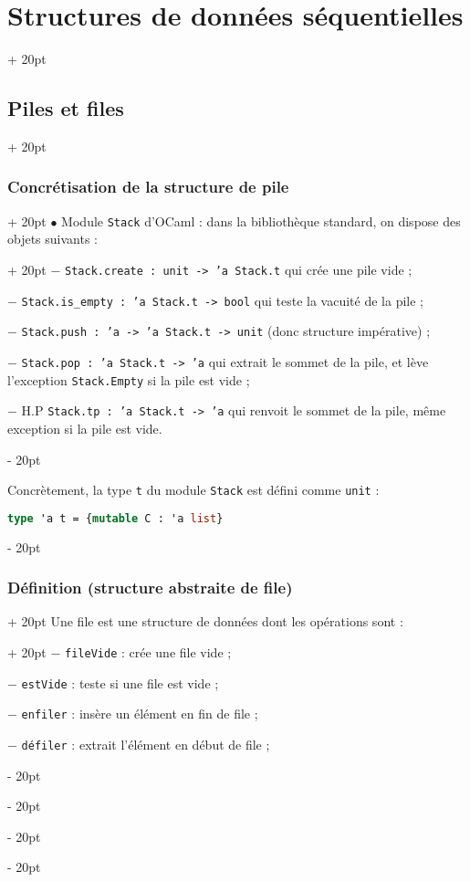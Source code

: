 \documentclass[a4paper, 12pt, twoside]{article}
\newcommand{\ind}[1][20pt]{\advance\leftskip + #1}
\newcommand{\deind}[1][20pt]{\advance\leftskip - #1}
\newenvironment{indt}[2][20pt]{#2 \par \ind[#1]}{\par \deind} %
\begin{document}
\begin{indt}{\section{Structures de données séquentielles}}
\begin{indt}{\subsection{Piles et files}}
\begin{indt}{\subsubsection{Concrétisation de la structure de pile}}
\begin{indt}{$\bullet$ Module \texttt{Stack} d'OCaml : dans la bibliothèque standard, on dispose des objets suivants :}
                    $-$ \texttt{Stack.create : unit -> 'a Stack.t} qui crée une pile vide ;
                    
                    $-$ \texttt{Stack.is\_empty : 'a Stack.t -> bool} qui teste la vacuité de la pile ;
                    
                    $-$ \texttt{Stack.push : 'a -> 'a Stack.t -> unit} (donc structure impérative) ;
                    
                    $-$ \texttt{Stack.pop : 'a Stack.t -> 'a} qui extrait le sommet de la pile, et lève l'exception \texttt{Stack.Empty} si la pile est vide ;
                    
                    $-$ H.P \texttt{Stack.tp : 'a Stack.t -> 'a} qui renvoit le sommet de la pile, même exception si la pile est vide.
                \end{indt}
                
                \vspace{6pt}
                
                Concrètement, la type \texttt t du module \texttt{Stack} est défini comme \texttt{unit} :
                
                \begin{lstlisting}[language=Caml, xleftmargin=80pt]
type 'a t = {mutable C : 'a list}\end{lstlisting}
                
            \end{indt}
            
            \vspace{6pt}
            
            \begin{indt}{\subsubsection{Définition (structure abstraite de file)}}
                \begin{indt}{Une file est une structure de données dont les opérations sont :}
                    $-$ \texttt{fileVide} : crée une file vide ;
                    
                    $-$ \texttt{estVide} : teste si une file est vide ;
                    
                    $-$ \texttt{enfiler} : insère un élément en fin de file ;
                    
                    $-$ \texttt{défiler} : extrait l'élément en début de file ;
                    

\end{indt}
\end{indt}
\end{indt}
\end{indt}
\end{document}

